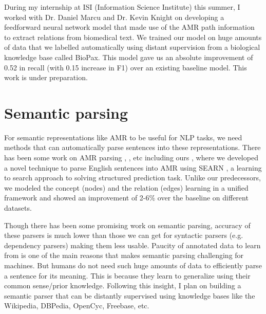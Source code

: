 \documentclass[11pt,a4paper]{article}
\begin{document}
During my internship at ISI (Information Science Institute) this summer, I worked with Dr. Daniel Marcu and Dr. Kevin Knight on developing a feedforward neural network model that made use of the AMR path information to extract relations from biomedical text. We trained our model on huge amounts of data that we labelled automatically using distant supervision from a biological knowledge base called BioPax. This model gave us an absolute improvement of 0.52 in recall (with 0.15 increase in F1) over an existing baseline model. This work is under preparation.

\section{Semantic parsing}
For semantic representations like AMR to be useful for NLP tasks, we need methods that can automatically parse sentences into these representations. There has been some work on AMR parsing \cite{flanigan-EtAl:2014:P14-1}, \cite{DBLP:conf/emnlp/PustHKMM15}, etc including ours \cite{rao2015parser}, where we developed a novel technique to parse English sentences into AMR using SEARN \cite{daume2009search}, a learning to search approach to solving structured prediction task. Unlike our predecessors, we modeled the concept (nodes) and the relation (edges) learning in a unified framework and showed an improvement of 2-6\% over the baseline on different datasets. 

Though there has been some promising work on semantic parsing, accuracy of these parsers is much lower than those we can get for syntactic parsers (e.g. dependency parsers) making them less usable. Paucity of annotated data to learn from is one of the main reasons that makes semantic parsing challenging for machines. But humans do not need such huge amounts of data to efficiently parse a sentence for its meaning. This is because they learn to generalize using their common sense/prior knowledge. Following this insight, I plan on building a semantic parser that can be distantly supervised using knowledge bases like the Wikipedia, DBPedia, OpenCyc, Freebase, etc.
\end{document}

